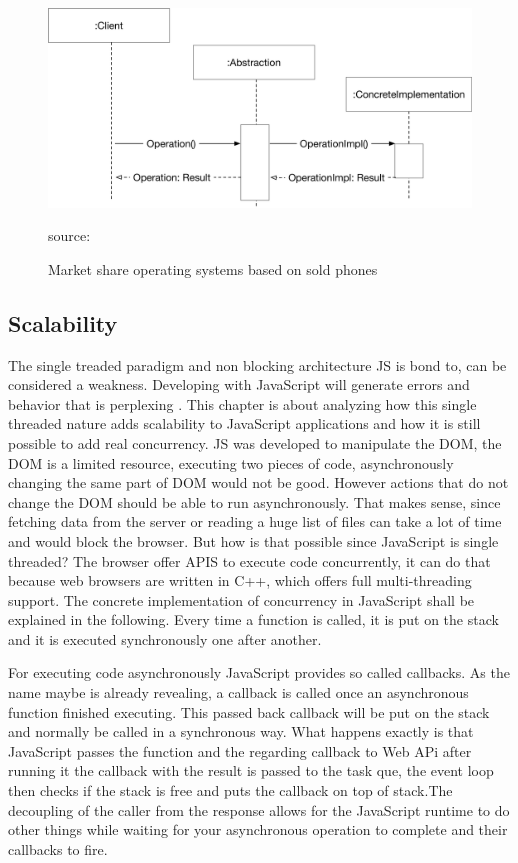 \begin{figure}[hb]
	\centering
	\includegraphics[scale=0.6]{bilder/grundlagen/BridgePattern.png}
	\caption{Market share operating systems based on sold phones} source:\cite{JS}
	\label{fig:MS}
\end{figure}


\subsection{Scalability}
The single treaded paradigm and non blocking architecture \gls{JS}  is bond to, can be considered a weakness. Developing with JavaScript will generate errors and behavior that is perplexing . This chapter is about analyzing how this single threaded nature adds scalability to JavaScript applications and how it is still possible to add real concurrency. \gls{JS} was developed to manipulate the DOM, the DOM is a limited resource, executing two pieces of code, asynchronously changing the same part of DOM would not be good. However actions that do not change the DOM should be able to run asynchronously. That makes sense, since fetching data from the server or reading a huge list of files can take a lot of time and would block the browser. But how is that possible since JavaScript is single threaded? The browser offer APIS to execute code concurrently, it can do that because web browsers are written in C++, which offers full multi-threading support. The concrete implementation of concurrency in JavaScript shall be explained in the following. Every time a function is called, it is put on the stack and it is executed synchronously one after another.


 For executing code asynchronously JavaScript provides so called callbacks. As the name maybe is already revealing, a callback is called once an asynchronous function finished executing. This passed back callback will be put on the stack and normally be called in a synchronous way. What happens exactly is that JavaScript passes the function and the regarding callback to Web APi after running it the callback with the result  is passed to the task que, the event loop then checks if the stack is free and puts the callback on top of stack.The decoupling of the caller from the response allows for the JavaScript runtime to do other things while waiting for your asynchronous operation to complete and their callbacks to fire.








